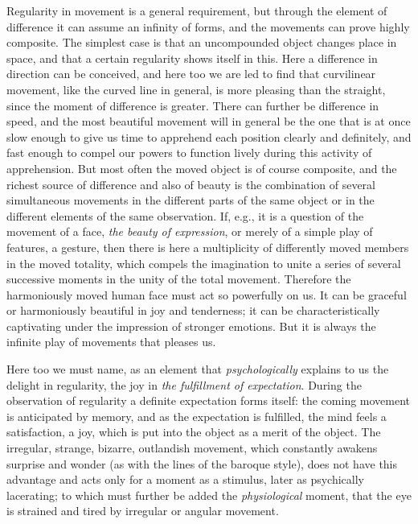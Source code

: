 \documentclass[12pt,a4paper,openany]{book}
\newcommand{\opage}[1]{\marginnote{\footnotesize\textit{[#1]}}}
\begin{document}
Regularity in movement is a general requirement,
\setcounter{footnote}{0}%
\opage{269}but through the element of difference it can assume an infinity
of forms, and the movements can prove highly composite.
The simplest case is that an uncompounded object
changes place in space, and that a certain regularity shows itself in this.
Here a difference in direction can be conceived, and here too
we are led to find that curvilinear movement, like the
curved line in general, is more pleasing than the straight, since
the moment of difference is greater. There can further be difference
in speed, and the most beautiful movement will in general
be the one that is at once slow enough to give
us time to apprehend each position clearly and definitely, and fast
enough to compel our powers to function lively during this
activity of apprehension. But most often the moved
object is of course composite, and the richest source of difference and
also of beauty is the combination of several simultaneous movements
in the different parts of the same object or in the different
elements of the same observation. If, e.g., it is a question
of the movement of a face, \emph{the beauty of expression}, or
merely of a simple play of features, a gesture, then there is here a
multiplicity of differently moved members in the moved
totality, which compels the imagination to unite a series
of several successive moments in the unity of the total movement. Therefore
the harmoniously moved human face must act
so powerfully on us. It can be graceful or harmoniously beautiful
in joy and tenderness; it can be characteristically captivating
under the impression of stronger emotions. But
it is always the infinite play of movements that pleases us.

Here too we must name, as an element that \emph{psychologically}
explains to us the delight in regularity, the joy
in \emph{the fulfillment of expectation}. During the observation
of regularity a definite expectation forms itself:
the coming movement is anticipated by memory,
and as the expectation is fulfilled, the mind feels a satisfaction,
a joy, which is put into the object as a merit
of the object. The irregular, strange, bizarre, outlandish
\setcounter{footnote}{0}%
\opage{270}movement, which constantly awakens surprise and wonder
(as with the lines of the baroque style), does not have this advantage
and acts only for a moment as a stimulus, later as psychically lacerating;
to which must further be added the \emph{physiological}
moment, that the eye is strained and tired by irregular
or angular movement.
\end{document}
